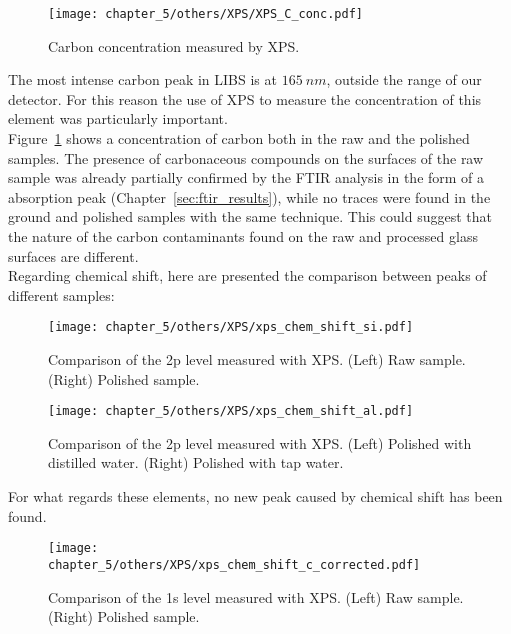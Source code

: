 \begin{figure}[H]
   \centering
   \texttt{[image: chapter\_5/others/XPS/XPS\_C\_conc.pdf]} 
   \vspace*{-30pt}
   \caption{Carbon concentration measured by XPS. }
   \label{fig:c_xps}
\end{figure}
The most intense carbon peak in LIBS is at $165 \: nm$, outside the range of our detector. For this reason the use of XPS to measure the concentration of this element was particularly important.
\\
Figure~\ref{fig:c_xps} shows a concentration of carbon both in the raw and the polished samples. The presence of carbonaceous compounds on the surfaces of the raw sample was already partially confirmed by the FTIR analysis in the form of a  absorption peak (Chapter~\ref{sec:ftir_results}), while no traces were found in the ground and polished samples with the same technique. This could suggest that the nature of the carbon contaminants found on the raw and processed glass surfaces are different.
\\
Regarding chemical shift, here are presented the comparison between peaks of different samples:

\begin{figure}[H]
   \centering
   \texttt{[image: chapter\_5/others/XPS/xps\_chem\_shift\_si.pdf]} 
   \vspace*{-30pt}
   \caption{Comparison of the 2p level measured with XPS. (Left) Raw sample. (Right) Polished sample.}
   \label{fig:xps_shift_si}
\end{figure}

\begin{figure}[H]
   \centering
   \texttt{[image: chapter\_5/others/XPS/xps\_chem\_shift\_al.pdf]} 
   \vspace*{-30pt}
   \caption{Comparison of the 2p level measured with XPS. (Left) Polished with distilled water. (Right) Polished with tap water.}
   \label{fig:xps_shift_al}
\end{figure}

For what regards these elements, no new peak caused by chemical shift has been found.


\begin{figure}[H]
   \centering
   \texttt{[image: chapter\_5/others/XPS/xps\_chem\_shift\_c\_corrected.pdf]} 
   \vspace*{-30pt}
   \caption{Comparison of the 1s level measured with XPS. (Left) Raw sample. (Right) Polished sample.}
   \label{fig:xps_shift_c}
\end{figure}


